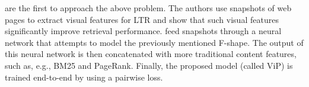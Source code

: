 \citet{fan2017learning} are the first to approach the above problem.
The authors use snapshots of web pages to extract visual features for LTR
and show that such visual features significantly improve retrieval performance.
\citet{fan2017learning} feed snapshots through a neural network that attempts to model the previously mentioned F-shape.
The output of this neural network is then concatenated with more traditional content features, such as, e.g., BM25 and PageRank.
Finally, the proposed model (called ViP) is trained end-to-end by using a pairwise loss.



